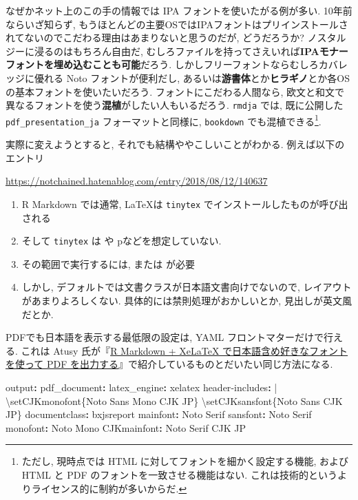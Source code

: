 \documentclass[
  nomag]{bxjsbook}
\newenvironment{Shaded}{\begin{snugshade}}{\end{snugshade}}
\newcommand{\AttributeTok}[1]{\textcolor[rgb]{0.77,0.63,0.00}{#1}}
\newcommand{\CharTok}[1]{\textcolor[rgb]{0.31,0.60,0.02}{#1}}
\newcommand{\FunctionTok}[1]{\textcolor[rgb]{0.00,0.00,0.00}{#1}}
\newcommand{\KeywordTok}[1]{\textcolor[rgb]{0.13,0.29,0.53}{\textbf{#1}}}
\newcommand{\NormalTok}[1]{#1}
\providecommand{\tightlist}{%
  \setlength{\itemsep}{0pt}\setlength{\parskip}{0pt}}
\theoremstyle{definition}
\theoremstyle{definition}
\theoremstyle{definition}
\theoremstyle{remark}
\begin{document}
なぜかネット上のこの手の情報では IPA フォントを使いたがる例が多い.
10年前ならいざ知らず,
もうほとんどの主要OSではIPAフォントはプリインストールされてないのでこだわる理由はあまりないと思うのだが,
どうだろうか? ノスタルジーに浸るのはもちろん自由だ,
むしろファイルを持ってさえいれば\textbf{IPAモナーフォントを埋め込むことも可能}だろう.
しかしフリーフォントならむしろカバレッジに優れる Noto
フォントが便利だし,
あるいは\textbf{游書体}とか\textbf{ヒラギノ}とか各OSの基本フォントを使いたいだろう.
フォントにこだわる人間なら,
欧文と和文で異なるフォントを使う\textbf{混植}がしたい人もいるだろう.
\texttt{rmdja} では, 既に公開した \texttt{pdf\_presentation\_ja}
フォーマットと同様に, \texttt{bookdown} でも混植できる\footnote{ただし,
  現時点では HTML に対してフォントを細かく設定する機能, および HTML と
  PDF のフォントを一致させる機能はない.
  これは技術的というよりライセンス的に制約が多いからだ.}.

実際に変えようとすると, それでも結構ややこしいことがわかる.
例えば以下のエントリ

\url{https://notchained.hatenablog.com/entry/2018/08/12/140637}

\begin{enumerate}
\def\labelenumi{\arabic{enumi}.}
\tightlist
\item
  R Markdown では通常, \LaTeX は \texttt{tinytex}
  でインストールしたものが呼び出される
\item
  そして \texttt{tinytex} は \pLaTeX や p\BibTeX などを想定していない.
\item
  その範囲で実行するには, \XeLaTeX または \LuaLaTeX が必要
\item
  しかし, デフォルトでは文書クラスが日本語文書向けでないので,
  レイアウトがあまりよろしくない. 具体的には禁則処理がおかしいとか,
  見出しが英文風だとか.
\end{enumerate}

PDFでも日本語を表示する最低限の設定は, YAML フロントマターだけで行える.
これは Atusy
氏が『\href{https://blog.atusy.net/2019/05/14/rmd2pdf-any-font/}{R
Markdown + XeLaTeX で日本語含め好きなフォントを使って PDF
を出力する}』で紹介しているものとだいたい同じ方法になる.

\begin{Shaded}
\begin{Highlighting}[]
\FunctionTok{output}\KeywordTok{:}
\AttributeTok{  }\FunctionTok{pdf\_document}\KeywordTok{:}
\AttributeTok{    }\FunctionTok{latex\_engine}\KeywordTok{:}\AttributeTok{ xelatex}
\FunctionTok{header{-}includes}\KeywordTok{: }\CharTok{|}
\NormalTok{  \textbackslash{}setCJKmonofont\{Noto Sans Mono CJK JP\}}
\NormalTok{  \textbackslash{}setCJKsansfont\{Noto Sans CJK JP\}}
\FunctionTok{documentclass}\KeywordTok{:}\AttributeTok{ bxjsreport}
\FunctionTok{mainfont}\KeywordTok{:}\AttributeTok{ Noto Serif}
\FunctionTok{sansfont}\KeywordTok{:}\AttributeTok{ Noto Serif}
\FunctionTok{monofont}\KeywordTok{:}\AttributeTok{ Noto Mono}
\FunctionTok{CJKmainfont}\KeywordTok{:}\AttributeTok{ Noto Serif CJK JP}
\end{Highlighting}
\end{Shaded}
\end{document}
